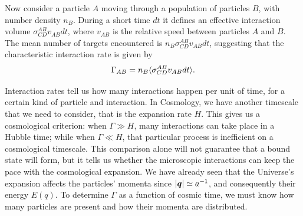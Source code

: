 Now consider a particle $A$ moving through a population of particles $B$, with number density $n_B$. During a short time $dt$ it defines an effective interaction volume $\sigma^{AB}_{CD}v_{AB}dt$, where $v_{AB}$ is the relative speed between particles $A$ and $B$. The mean number of targets encountered is $n_B\sigma^{AB}_{CD}v_{AB}dt$, suggesting that the characteristic interaction rate is given by 
\begin{equation}
    \Gamma_{AB} = n_B\langle \sigma^{AB}_{CD}v_{AB}dt \rangle.
\end{equation}

Interaction rates tell us how many interactions happen per unit of time, for a certain kind of particle and interaction. In Cosmology, we have another timescale that we need to consider, that is the expansion rate $H$. This gives us a cosmological criterion: when $\Gamma \gg H$, many interactions can take place in a Hubble time; while when $\Gamma \ll H$, that particular process is inefficient on a cosmological timescale. This comparison alone will not guarantee that a bound state will form, but it tells us whether the microscopic interactions can keep the pace with the cosmological expansion. We have already seen that the Universe's expansion affects the particles' momenta since $|\bm{q}| \simeq a^{-1}$, and consequently their energy $E(q)$. To determine $\Gamma$ as a function of cosmic time, we must know how many particles are present and how their momenta are distributed. 

